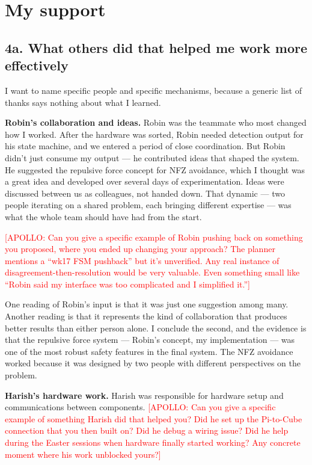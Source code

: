 \section{My support}


\subsection{4a. What others did that helped me work more effectively}

I want to name specific people and specific mechanisms, because a generic list of thanks says nothing about what I learned.

\textbf{Robin's collaboration and ideas.} Robin was the teammate who most changed how I worked. After the hardware was sorted, Robin needed detection output for his state machine, and we entered a period of close coordination. But Robin didn't just consume my output --- he contributed ideas that shaped the system. He suggested the repulsive force concept for NFZ avoidance, which I thought was a great idea and developed over several days of experimentation. Ideas were discussed between us as colleagues, not handed down. That dynamic --- two people iterating on a shared problem, each bringing different expertise --- was what the whole team should have had from the start.

\textcolor{red}{[APOLLO: Can you give a specific example of Robin pushing back on something you proposed, where you ended up changing your approach? The planner mentions a ``wk17 FSM pushback'' but it's unverified. Any real instance of disagreement-then-resolution would be very valuable. Even something small like ``Robin said my interface was too complicated and I simplified it.'']}

One reading of Robin's input is that it was just one suggestion among many. Another reading is that it represents the kind of collaboration that produces better results than either person alone. I conclude the second, and the evidence is that the repulsive force system --- Robin's concept, my implementation --- was one of the most robust safety features in the final system. The NFZ avoidance worked because it was designed by two people with different perspectives on the problem.

\textbf{Harish's hardware work.} Harish was responsible for hardware setup and communications between components. \textcolor{red}{[APOLLO: Can you give a specific example of something Harish did that helped you? Did he set up the Pi-to-Cube connection that you then built on? Did he debug a wiring issue? Did he help during the Easter sessions when hardware finally started working? Any concrete moment where his work unblocked yours?]}

